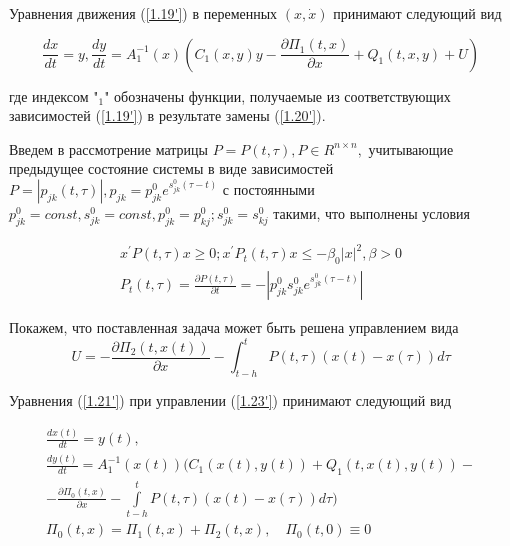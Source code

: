 Уравнения движения (\ref{1.19'}) в переменных $(x, \dot x)$ принимают следующий вид 

\begin{equation} \label{1.21'}
\frac{dx}{dt} = y, \frac{dy}{dt} = A^{-1}_1(x) (C_1(x, y) y - \frac{\partial \Pi_1 (t, x)}{\partial x} + Q_1 (t, x, y) + U)
\end{equation}

где индексом "$_1$" обозначены функции, получаемые из соответствующих зависимостей (\ref{1.19'}) в результате замены (\ref{1.20'}).

Введем в рассмотрение матрицы $P = P(t, \tau), P \in R^{n \times n},$ учитывающие предыдущее состояние системы в виде зависимостей $P = \left| p_{jk} (t, \tau) \right|, p_{jk} = p_{jk}^0 e^{s_{jk}^0 (\tau - t)}$ с постоянными $p_{jk}^0 = const, s_{jk}^0 = const, p_{jk}^0 = p_{kj}^0; s_{jk}^0 = s_{kj}^0$ такими, что выполнены условия


\begin{equation} \label{1.22'}
	\begin{array}{c}
		x^{'} P (t, \tau) x \ge 0; x^{'} P_t (t, \tau) x \le - \beta_0 \left| x \right|^2, \beta > 0\\
		P_t(t, \tau) = \frac{\partial P (t, \tau)}{\partial t} = - \left| p_{jk}^0 s_{jk}^{0} e^{s_{jk}^0 (\tau - t)} \right|
	\end{array}
\end{equation}

Покажем, что поставленная задача может быть решена управлением вида
\begin{equation} \label{1.23'}
U = - \frac{\partial \Pi_2 (t, x(t))}{\partial x} - \int_{t - h}^{t} P(t, \tau) (x(t) - x(\tau)) d \tau
\end{equation}

Уравнения (\ref{1.21'}) при управлении (\ref{1.23'}) принимают следующий вид

\begin{equation} \label{1.24'}
\begin{array}{c}
\frac{d x(t)}{dt}=y(t),\\
\frac{d y(t)}{dt} = A_1^{-1} (x(t)) (C_1(x(t), y(t)) + Q_1(t, x(t), y(t)) -\\- \frac{\partial \Pi_0 (t, x)}{\partial x} - \int \limits_{t - h}^{t} P(t, \tau) (x(t) - x(\tau)) d \tau)\\
\Pi_0 (t, x) = \Pi_1(t, x) + \Pi_2 (t, x), \quad \Pi_0 (t, 0) \equiv 0
\end{array}
\end{equation}

